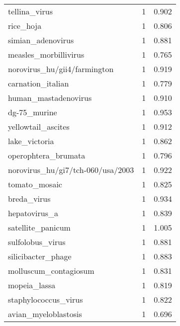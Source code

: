 \begin{tabular}{lrr}
                            tellina\_virus &                   1 &     0.902 \\
                                rice\_hoja &                   1 &     0.806 \\
                        simian\_adenovirus &                   1 &     0.881 \\
                    measles\_morbillivirus &                   1 &     0.765 \\
             norovirus\_hu/gii4/farmington &                   1 &     0.919 \\
                        carnation\_italian &                   1 &     0.779 \\
                     human\_mastadenovirus &                   1 &     0.910 \\
                             dg-75\_murine &                   1 &     0.953 \\
                       yellowtail\_ascites &                   1 &     0.912 \\
                            lake\_victoria &                   1 &     0.862 \\
                      operophtera\_brumata &                   1 &     0.796 \\
        norovirus\_hu/gi7/tch-060/usa/2003 &                   1 &     0.922 \\
                            tomato\_mosaic &                   1 &     0.825 \\
                              breda\_virus &                   1 &     0.934 \\
                            hepatovirus\_a &                   1 &     0.839 \\
                        satellite\_panicum &                   1 &     1.005 \\
                         sulfolobus\_virus &                   1 &     0.881 \\
                       silicibacter\_phage &                   1 &     0.883 \\
                    molluscum\_contagiosum &                   1 &     0.831 \\
                             mopeia\_lassa &                   1 &     0.819 \\
                     staphylococcus\_virus &                   1 &     0.822 \\
                     avian\_myeloblastosis &                   1 &     0.696 \\

\end{tabular}
